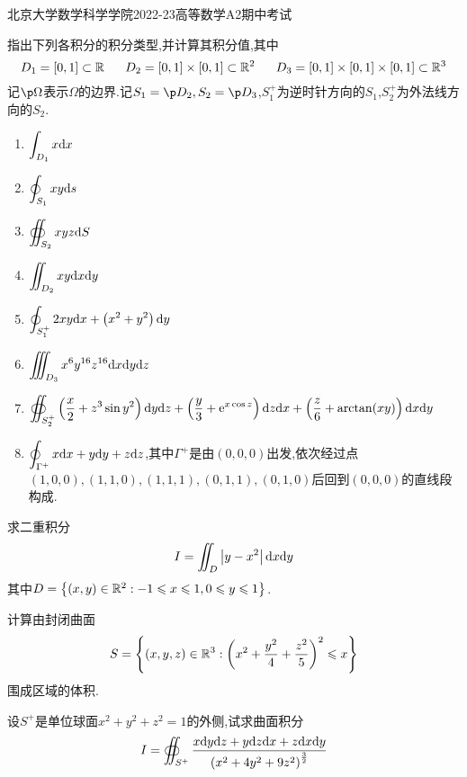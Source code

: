 \documentclass{ctexart}
\begin{document}
\pagestyle{empty}
\begin{center}\Large
    北京大学数学科学学院2022-23高等数学A2期中考试
\end{center}
\begin{problem}[1.(32\songti{分})]
    指出下列各积分的积分类型,并计算其积分值,其中
    \[D_1=[0,1]\subset\R\ \ \ \ \ D_2=[0,1]\times[0,1]\subset\R^2\ \ \ \ \ D_3=[0,1]\times[0,1]\times[0,1]\subset\R^3\]
    记$\p\Omega$表示$\Omega$的边界.记$S_1=\p D_2,S_2=\p D_3$,$S_1^+$为逆时针方向的$S_1$,$S_2^+$为外法线方向的$S_2$.
    \begin{enumerate}[label=\tbf{(\arabic*)}]
        \item $\displaystyle\int_{D_1}x\mathrm{d} x$
        \item $\displaystyle\oint_{S_1}xy\mathrm{d} s$
        \item $\displaystyle\oiint_{S_2}xyz\mathrm{d} S$
        \item $\displaystyle\iint_{D_2}xy\mathrm{d} x\mathrm{d} y$
        \item $\displaystyle\oint_{S_1^+}2xy\mathrm{d} x+\left(x^2+y^2\right)\mathrm{d} y$
        \item $\displaystyle\iiint_{D_3}x^6y^{16}z^{16}\mathrm{d} x\mathrm{d} y\mathrm{d} z$
        \item $\displaystyle\oiint_{S_2^+}\left(\dfrac x2+z^3\sin y^2\right)\mathrm{d} y\mathrm{d} z+\left(\dfrac y3+\mathrm{e}^{x\cos z}\right)\mathrm{d} z\mathrm{d} x+\left(\dfrac z6+\arctan(xy)\right)\mathrm{d} x\mathrm{d} y$
        \item $\displaystyle\oint_{\Gamma^+}x\mathrm{d} x+y\mathrm{d} y+z\mathrm{d} z$,其中$\Gamma^+$是由$(0,0,0)$出发,依次经过点$(1,0,0),(1,1,0),(1,1,1),(0,1,1),(0,1,0)$后回到$(0,0,0)$的直线段构成.
    \end{enumerate}

\end{problem}
\begin{problem}[2.(12\songti{分})]
    求二重积分
    \[I=\iint_{D}\left|y-x^2\right|\mathrm{d} x\mathrm{d} y\]
    其中$D=\left\{(x,y)\in\mathbb{R}^2:-1\leqslant x\leqslant1,0\leqslant y\leqslant1\right\}$.

\end{problem}
\begin{problem}[3.(12\songti{分})]
    计算由封闭曲面
    \[S=\left\{(x,y,z)\in\mathbb{R}^3:\left(x^2+\dfrac{y^2}{4}+\dfrac{z^2}{5}\right)^2\leqslant x\right\}\]
    围成区域的体积.

\end{problem}
\begin{problem}[4.(12\songti{分})]
    设$S^+$是单位球面$x^2+y^2+z^2=1$的外侧,试求曲面积分
    \[I=\oiint_{S^+}\dfrac{x\mathrm{d} y\mathrm{d} z+y\mathrm{d} z\mathrm{d} x+z\mathrm{d} x\mathrm{d} y}{\left(x^2+4y^2+9z^2\right)^{\frac32}}\]  
\end{problem}
\end{document}
